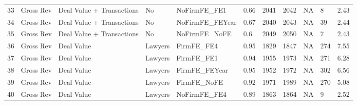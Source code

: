 \documentclass{article}
\begin{document}
\begin{table}[H]
\begin{tabular}{rllllllllll}
  33 & Gross Rev & Deal Value + Transactions & No & NoFirmFE\_FE1 & 0.66 & 2041 & 2042 & NA & 8 & 2.43 \\
  34 & Gross Rev & Deal Value + Transactions & No & NoFirmFE\_FEYear & 0.67 & 2040 & 2043 & NA & 39 & 2.44 \\
  35 & Gross Rev & Deal Value + Transactions & No & NoFirmFE\_NoFE & 0.6 & 2049 & 2050 & NA & 7 & 2.43 \\
  36 & Gross Rev & Deal Value & Lawyers & FirmFE\_FE4 & 0.95 & 1829 & 1847 & NA & 274 & 7.55 \\
  37 & Gross Rev & Deal Value & Lawyers & FirmFE\_FE1 & 0.94 & 1955 & 1973 & NA & 271 & 6.28 \\
  38 & Gross Rev & Deal Value & Lawyers & FirmFE\_FEYear & 0.95 & 1952 & 1972 & NA & 302 & 6.56 \\
  39 & Gross Rev & Deal Value & Lawyers & FirmFE\_NoFE & 0.92 & 1971 & 1989 & NA & 270 & 5.08 \\
  40 & Gross Rev & Deal Value & Lawyers & NoFirmFE\_FE4 & 0.89 & 1863 & 1864 & NA & 9 & 2.52 \\
   \hline
\end{tabular}
\end{table}
\end{document}
